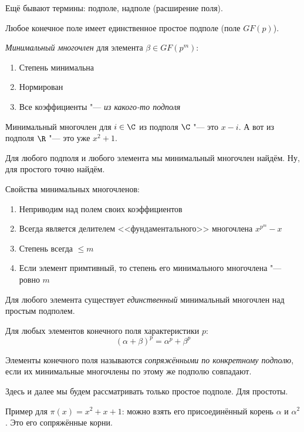 Ещё бывают термины: подполе, надполе (расширение поля).

\begin{theorem}
Любое конечное поле имеет единственное простое подполе (поле $GF(p)$).
\end{theorem}

\begin{Def}
	\textit{Минимальный многочлен} для элемента $\beta \in GF(p^m)$:
	\begin{enumerate}
	\item Степень минимальна
	\item Нормирован
	\item Все коэффициенты "--- \textit{из какого-то подполя}
	\end{enumerate}
\end{Def}
\begin{exmp}
	Минимальный многочлен для $i \in \C$ из подполя $\C$ "--- это $x-i$.
	А вот из подполя $\R$ "--- это уже $x^2+1$.
\end{exmp}
\begin{theorem}
	Для любого подполя и любого элемента мы минимальный многочлен найдём.
	Ну, для простого точно найдём.
\end{theorem}
\begin{Rem}
	Свойства минимальных многочленов:
	\begin{enumerate}
	\item Неприводим над полем своих коэффициентов
	\setcounter{enumerate}{2}
	\item Всегда является делителем <<фундаментального>> многочлена $x^{p^m}-x$
	\item Степень всегда $\le m$
	\item Если элемент примтивный, то степень его минимального многочлена "--- ровно $m$
	\end{enumerate}
\end{Rem}
\begin{theorem}
	Для любого элемента существует \textit{единственный} минимальный многочлен над простым подполем.
\end{theorem}

\begin{lemma}
	Для любых элементов конечного поля характеристики $p$:
	\[ (\alpha + \beta)^p = \alpha^p+\beta^p \]
\end{lemma}
\begin{Def}
	Элементы конечного поля называются \textit{сопряжёнными по конкретному подполю},
	если их минимальные многочлены по этому же подполю совпадают.
\end{Def}
\begin{Rem}
	Здесь и далее мы будем рассматривать только простое подполе.
	Для простоты.
\end{Rem}
\begin{exmp}
	Пример для $\pi(x)=x^2+x+1$: можно взять его
	присоединённый корень $\alpha$ и $\alpha^2$.
	Это его сопряжённые корни.
\end{exmp}

